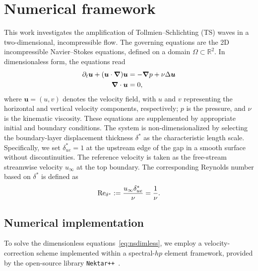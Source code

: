 \documentclass[../main.tex]{subfiles}
\begin{document}
\section{Numerical framework}\label{sec:theory}

This work investigates the amplification of Tollmien--Schlichting (TS) waves in a two-dimensional, incompressible flow. The governing equations are the 2D incompressible Navier--Stokes equations, defined on a domain $\Omega \subset \mathbb{R}^2$. In dimensionaless form, the equations read
\begin{equation}
	\begin{aligned}
		\partial_t \bm{u} + (\bm{u} \cdot \bm{\nabla}) \bm{u} & = -\bm{\nabla} p + \nu \Delta \bm{u} \\
		\bm{\nabla} \cdot \bm{u}                              & = 0,
	\end{aligned}
	\label{eq:nsdimless}
\end{equation}
where $\mathbf{u} = (u, v)$ denotes the velocity field, with $u$ and $v$ representing the horizontal and vertical velocity components, respectively; $p$ is the pressure, and $\nu$ is the kinematic viscosity. These equations are supplemented by appropriate initial and boundary conditions. The system is non-dimensionalized by selecting the boundary-layer displacement thickness $\delta^*$ as the characteristic length scale. Specifically, we set $\delta^*_{ue} = 1$ at the upstream edge of the gap in a smooth surface without discontinuities. The reference velocity is taken as the free-stream streamwise velocity $u_\infty$ at the top boundary. The corresponding Reynolds number based on $\delta^*$ is defined as
\[
	\text{Re}_{\delta^*} := \frac{u_\infty \delta^*_{ue}}{\nu} = \frac{1}{\nu}.
\]


\subsection{Numerical implementation}\label{sec:numericalimplementation}

To solve the dimensionless equations~\eqref{eq:nsdimless}, we employ a velocity-correction scheme implemented within a spectral-$hp$ element framework, provided by the open-source library \texttt{Nektar++}~\cite{nektaruserguide}.
\end{document}

